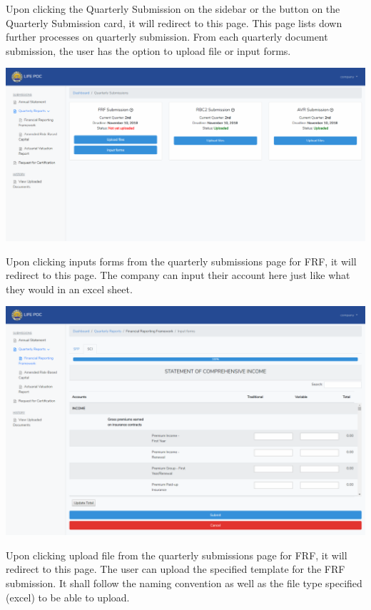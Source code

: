 \documentclass{article}
\begin{document}
\noindent{}Upon clicking the Quarterly Submission on the sidebar
or the button on the Quarterly Submission card, it will redirect to this
page. This page lists down further processes on quarterly submission.
From each quarterly document submission, the user has the option to
upload file or input forms.%

\includegraphics[keepaspectratio=true]{up-ic-screens/image36}{}%

\mdhr{}%

\noindent{}Upon clicking inputs forms from the quarterly submissions page for
FRF, it will redirect to this page. The company can input their account
here just like what they would in an excel sheet.%

\includegraphics[keepaspectratio=true]{up-ic-screens/image166}{}%

\mdhr{}%

\noindent{}Upon clicking upload file from the quarterly
submissions page for FRF, it will redirect to this page. The user can
upload the specified template for the FRF submission. It shall follow
the naming convention as well as the file type specified (excel) to be
able to upload.%
\end{document}
